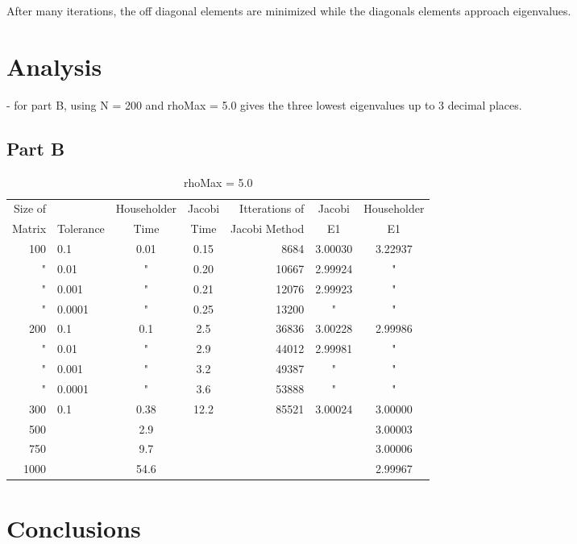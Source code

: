 \documentclass[twocolumn, groupedaddress]{revtex4-1}
\begin{document}
After many iterations, the off diagonal elements are minimized while the diagonals elements approach eigenvalues. 


\section{Analysis}

- for part B, using N = 200 and rhoMax = 5.0 gives the three lowest eigenvalues up to 3 decimal places.

\subsection{Part B}

\begin{table*}[t]
	\centering
	\begin{tabular}{ r | l || c | c | r | c | c}
		Size of &           & Householder & Jacobi & Itterations of & Jacobi & Householder \\
		Matrix  & Tolerance &    Time     &  Time  & Jacobi Method  &   E1   &      E1     \\
		\hline
		 100 & 0.1    & 0.01 &  0.15 &  8684 & 3.00030 & 3.22937 \\
		  "  & 0.01   &  "   &  0.20 & 10667 & 2.99924 &    "    \\
		  "  & 0.001  &  "   &  0.21 & 12076 & 2.99923 &    "    \\
		  "  & 0.0001 &  "   &  0.25 & 13200 &    "    &    "    \\
		 200 & 0.1    & 0.1  &  2.5  & 36836 & 3.00228 & 2.99986 \\
		  "  & 0.01   &  "   &  2.9  & 44012 & 2.99981 &    "    \\
		  "  & 0.001  &  "   &  3.2  & 49387 &    "    &    "    \\
		  "  & 0.0001 &  "   &  3.6  & 53888 &    "    &    "    \\
		 300 & 0.1    & 0.38 & 12.2  & 85521 & 3.00024 & 3.00000 \\
		 500 &        & 2.9  &       &       &         & 3.00003 \\
		 750 &        & 9.7  &       &       &         & 3.00006 \\ 
		1000 &        & 54.6 &       &       &         & 2.99967 \\
		
	\end{tabular}
	\caption{rhoMax = 5.0 \label{table:relults}}
\end{table*}


\section{Conclusions}


\end{document}
